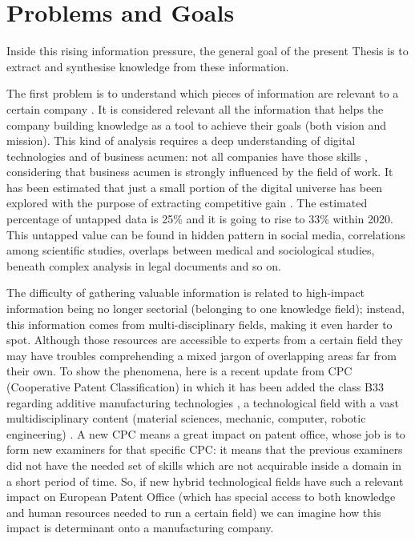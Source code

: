 \documentclass[]{book}
\theoremstyle{definition}
\theoremstyle{definition}
\theoremstyle{definition}
\theoremstyle{remark}
\begin{document}
\chapter*{Problems and Goals}\label{problems-and-goals}

Inside this rising information pressure, the general goal of the present
Thesis is to extract and synthesise knowledge from these information.

The first problem is to understand which pieces of information are
relevant to a certain company
\citep{larose2014discovering, chemchem2015data, kasemsap2015role}. It is
considered relevant all the information that helps the company building
knowledge as a tool to achieve their goals (both vision and mission).
This kind of analysis requires a deep understanding of digital
technologies and of business acumen: not all companies have those skills
\citep{hecklau2016holistic, davenport2012data, provost2013data, van2014data},
considering that business acumen is strongly influenced by the field of
work. It has been estimated that just a small portion of the digital
universe has been explored with the purpose of extracting competitive
gain \citep{data2012bigger}. The estimated percentage of untapped data
is 25\% and it is going to rise to 33\% within 2020. This untapped value
can be found in hidden pattern in social media, correlations among
scientific studies, overlaps between medical and sociological studies,
beneath complex analysis in legal documents and so on.

The difficulty of gathering valuable information is related to
high-impact information being no longer sectorial (belonging to one
knowledge field); instead, this information comes from
multi-disciplinary fields, making it even harder to spot. Although those
resources are accessible to experts from a certain field they may have
troubles comprehending a mixed jargon of overlapping areas far from
their own. To show the phenomena, here is a recent update from CPC
(Cooperative Patent Classification) in which it has been added the class
B33 regarding additive manufacturing technologies \citep{cpc2014}, a
technological field with a vast multidisciplinary content (material
sciences, mechanic, computer, robotic engineering)
\citep{mueller2012additive}. A new CPC means a great impact on patent
office, whose job is to form new examiners for that specific CPC: it
means that the previous examiners did not have the needed set of skills
which are not acquirable inside a domain in a short period of time. So,
if new hybrid technological fields have such a relevant impact on
European Patent Office (which has special access to both knowledge and
human resources needed to run a certain field) we can imagine how this
impact is determinant onto a manufacturing company.
\end{document}
